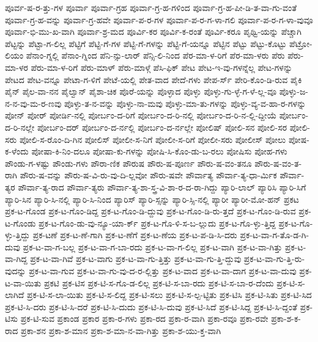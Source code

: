 {ಪೂರ್ವ-ಷ-ರ-ತ್ತು-ಗಳ
ಪೂರ್ವಾ
ಪೂರ್ವಾ-ಗ್ರಹ
ಪೂರ್ವಾ-ಗ್ರ-ಹ-ಗಳಿಂದ
ಪೂರ್ವಾ-ಗ್ರ-ಹ-ಪೀ-ಡಿ-ತ-ವಾ-ಗು-ವಂತೆ
ಪೂರ್ವಾ-ಗ್ರ-ಹ-ವನ್ನು
ಪೂರ್ವಾ-ಗ್ರ-ಹವೇ
ಪೂರ್ವಾ-ಪ-ರ-ಗಳ
ಪೂರ್ವಾ-ಪ-ರ-ಗ-ಳಾ-ಗಲಿ
ಪೂರ್ವಾ-ಪ-ರ-ಗ-ಳಾ-ವುವೂ
ಪೂರ್ವಾ-ಭಿ-ಮು-ಖ-ವಾಗಿ
ಪೂರ್ವಾ-ಶ್ರ-ಮದ
ಪೂರ್ವಿ-ಕರ
ಪೂರ್ವಿ-ಕ-ರಂತೆ
ಪೂರ್ವಿ-ಕರೂ
ಪೃಥ್ವಿ-ಯನ್ನು
ಪೆಚ್ಚಾಗಿ
ಪೆಟ್ಟನ್ನು
ಪೆಟ್ಟಾ-ಗ-ಲಿಲ್ಲ
ಪೆಟ್ಟಿಗೆ
ಪೆಟ್ಟಿ-ಗೆ-ಗಳ
ಪೆಟ್ಟಿ-ಗೆ-ಗಳನ್ನು
ಪೆಟ್ಟಿ-ಗೆ-ಯನ್ನೂ
ಪೆಟ್ಟಿನ
ಪೆಟ್ಟು
ಪೆಟ್ಟು-ಕೊಟ್ಟು
ಪೆಟ್ರೋ-ಲಿಯಂ
ಪೆನಾಂ-ಗ್ನಲ್ಲಿ
ಪೆನಾಂ-ಗ್ನಿಂದ
ಪೆನಿ-ನ್ಸು-ಲಾರ್
ಪೆನ್ಸಿ-ಲಿ-ನಿಂದ
ಪೆರ-ಮಾ-ಳ-ರಿಗೆ
ಪೆರ-ಮಾ-ಳರು
ಪೆರು
ಪೆರು-ಮಾ-ಳರ
ಪೆರು-ಮಾ-ಳ-ರಿಗೆ
ಪೆರು-ಮಾಳ್
ಪೆರು-ಮಾಳ್ಗೆ
ಪೆಸಿ-ಫಿಕ್
ಪೇಟ
ಪೇಟ-ಇ-ವು-ಗಳನ್ನೆಲ್ಲ
ಪೇಟ-ಗಳನ್ನು
ಪೇಟದ
ಪೇಟ-ವನ್ನೂ
ಪೇಟಾ-ಗ-ಳಿಗೆ
ಪೇಟೆ-ಯಲ್ಲಿ
ಪೇತ-ವಾದ
ಪೇದೆ-ಗಳು
ಪೇಪ-ರ್ಸ್
ಪೇರಿ-ಕೊಂ-ಡಿ-ರುವ
ಪೈಕಿ
ಪೈನ್
ಪೈಲ-ವಾ-ನನ
ಪೈಲ್ವಾನ್
ಪೈಶಾ-ಚಿಕ
ಪೊರೆ-ಯನ್ನು
ಪೊಳ್ಳಾದ
ಪೊಳ್ಳು
ಪೊಳ್ಳು-ಗು-ಳ್ಳೆ-ಗ-ಳೆ-ಲ್ಲ-ವೂ
ಪೊಳ್ಳು-ಜ-ನ-ನ-ವು-ಮ-ರ-ಣವು
ಪೊಳ್ಳು-ತ-ನ-ವನ್ನು
ಪೊಳ್ಳು-ನಾ-ಮವು
ಪೊಳ್ಳು-ಮಾ-ತು-ಗಳನ್ನು
ಪೊಳ್ಳು-ವ್ಯ-ವ-ಹಾ-ರ-ಗಳನ್ನು
ಪೋನ್
ಪೋರ್
ಪೋರ್ಡಿ-ನಲ್ಲಿ
ಪೋರ್ಬಂ-ದ-ರಿಗೆ
ಪೋರ್ಬಂ-ದ-ರಿ-ನಲ್ಲಿ
ಪೋರ್ಬಂ-ದ-ರಿ-ನ-ಲ್ಲಿ-ದ್ದೀಯೆ
ಪೋರ್ಬಂ-ದ-ರಿ-ನಲ್ಲೇ
ಪೋರ್ಬಂ-ದರ್
ಪೋರ್ಬಂ-ದ-ರ್ನಲ್ಲಿ
ಪೋರ್ಬಂ-ದ-ರ್ನಲ್ಲೇ
ಪೋಲಿಷ್
ಪೋಲಿ-ಸನ
ಪೋಲಿ-ಸರ
ಪೋಲಿ-ಸರು
ಪೋಲಿ-ಸ-ರೊಂ-ದಿ-ಗಿನ
ಪೋಲಿಸ್
ಪೋಲೀ-ಸ-ನಿಗೆ
ಪೋಲೀ-ಸ-ರಿಗೆ
ಪೋಲೀ-ಸರು
ಪೋಲೀಸ್
ಪೋಲು
ಪೋಷ-ಕ-ಳೆಂದು
ಪೋಷಾ-ಕಿ-ನಿಂ-ದಲೂ
ಪೋಷಾ-ಕು-ಗಳನ್ನು
ಪೋಷಿ-ಸಿ-ಕೊಂ-ಡು-ಬ-ರಲು
ಪೋಷಿಸು
ಪೋಹ-ಗಳು
ಪೌಂಡು-ಗ-ಳಷ್ಟು
ಪೌಂಡು-ಗಳು
ಪೌರಾ-ಣಿಕ
ಪೌರುಷ
ಪೌರು-ಷ-ಪೂರ್ಣ
ಪೌರು-ಷ-ವಂ-ತನೂ
ಪೌರು-ಷ-ವಂ-ತ-ರಾಗಿ
ಪೌರು-ಷ-ವನ್ನು
ಪೌರು-ಷ-ವಿ-ರು-ವು-ದಿ-ಲ್ಲವೋ
ಪೌರು-ಷವೇ
ಪೌರ್ವಾತ್ಯ
ಪೌರ್ವಾ-ತ್ಯ-ಧಾ-ರ್ಮಿಕ
ಪೌರ್ವಾ-ತ್ಯರ
ಪೌರ್ವಾ-ತ್ಯ-ರಾದ
ಪೌರ್ವಾ-ತ್ಯರು
ಪೌರ್ವಾ-ತ್ಯ-ಶಾ-ಸ್ತ್ರ-ವಿ-ಶಾ-ರ-ದ-ರಾ-ಗಿದ್ದು
ಪ್ಯಾರಿ-ಲಾಲ್
ಪ್ಯಾರಿಸಿ
ಪ್ಯಾರಿ-ಸಿಗೆ
ಪ್ಯಾರಿ-ಸಿನ
ಪ್ಯಾರಿ-ಸಿ-ನಲ್ಲಿ
ಪ್ಯಾರಿ-ಸಿ-ನಿಂದ
ಪ್ಯಾರಿಸ್
ಪ್ಯಾರಿ-ಸ್ಸನ್ನು
ಪ್ಯಾರಿ-ಸ್ಸಿ-ನಲ್ಲಿ
ಪ್ಯಾರೀ
ಪ್ಯಾರೀ-ಮೋ-ಹನ್
ಪ್ರಕಟ
ಪ್ರಕ-ಟ-ಗೊಂಡ
ಪ್ರಕ-ಟ-ಗೊಂ-ಡಿದ್ದ
ಪ್ರಕ-ಟ-ಗೊಂ-ಡಿ-ದ್ದುವು
ಪ್ರಕ-ಟ-ಗೊಂ-ಡಿ-ರು-ತ್ತದೆ
ಪ್ರಕ-ಟ-ಗೊಂ-ಡಿ-ರುವ
ಪ್ರಕ-ಟ-ಗೊಂಡು
ಪ್ರಕ-ಟ-ಗೊಂ-ಡು-ವು-ನ್ಯೂ-ಯಾ-ರ್ಕ್
ಪ್ರಕ-ಟ-ಗೊ-ಳಿ-ಸ-ಬ-ಲ್ಲುದು
ಪ್ರಕ-ಟ-ಗೊ-ಳ್ಳು-ತ್ತಿದ್ದ
ಪ್ರಕ-ಟ-ಗೊ-ಳ್ಳು-ತ್ತಿದ್ದು
ಪ್ರಕ-ಟಣೆ
ಪ್ರಕ-ಟ-ಣೆ-ಗಾಗಿ
ಪ್ರಕ-ಟ-ಣೆಗೆ
ಪ್ರಕ-ಟ-ಣೆಯ
ಪ್ರಕ-ಟ-ಪ-ಡಿ-ಸಿ-ದರು
ಪ್ರಕ-ಟ-ವಾ-ಗ-ತೊ-ಡ-ಗಿ-ದುವು
ಪ್ರಕ-ಟ-ವಾ-ಗ-ಬಲ್ಲ
ಪ್ರಕ-ಟ-ವಾ-ಗ-ಬಾ-ರದು
ಪ್ರಕ-ಟ-ವಾ-ಗ-ಲಿಲ್ಲ
ಪ್ರಕ-ಟ-ವಾಗಿ
ಪ್ರಕ-ಟ-ವಾ-ಗಿತ್ತು
ಪ್ರಕ-ಟ-ವಾ-ಗಿದ್ದ
ಪ್ರಕ-ಟ-ವಾ-ಗಿವೆ
ಪ್ರಕ-ಟ-ವಾಗು
ಪ್ರಕ-ಟ-ವಾ-ಗು-ತ್ತಿತ್ತು
ಪ್ರಕ-ಟ-ವಾ-ಗು-ತ್ತಿ-ದ್ದುವು
ಪ್ರಕ-ಟ-ವಾ-ಗು-ತ್ತಿ-ರು-ವುದನ್ನು
ಪ್ರಕ-ಟ-ವಾ-ಗುವ
ಪ್ರಕ-ಟ-ವಾ-ಗು-ವು-ದ-ರ-ಲ್ಲಿತ್ತು
ಪ್ರಕ-ಟ-ವಾದ
ಪ್ರಕ-ಟ-ವಾ-ದಾಗ
ಪ್ರಕ-ಟ-ವಾ-ದುವು
ಪ್ರಕ-ಟ-ವಾ-ಯಿತು
ಪ್ರಕಟಿ
ಪ್ರಕ-ಟಿಸ
ಪ್ರಕ-ಟಿ-ಸ-ಗೊ-ಡ-ಲಿಲ್ಲ
ಪ್ರಕ-ಟಿ-ಸ-ಬಾ-ರದು
ಪ್ರಕ-ಟಿ-ಸ-ಬಾ-ರ-ದೆಂದು
ಪ್ರಕ-ಟಿ-ಸ-ಲಾಗಿದೆ
ಪ್ರಕ-ಟಿ-ಸ-ಲಾ-ಯಿತು
ಪ್ರಕ-ಟಿ-ಸ-ಲಿದ್ದ
ಪ್ರಕ-ಟಿ-ಸಲು
ಪ್ರಕ-ಟಿ-ಸ-ಲ್ಪ-ಟ್ಟಿತು
ಪ್ರಕ-ಟಿಸಿ
ಪ್ರಕ-ಟಿ-ಸಿತು
ಪ್ರಕ-ಟಿ-ಸಿದ
ಪ್ರಕ-ಟಿ-ಸಿ-ದರು
ಪ್ರಕ-ಟಿ-ಸಿ-ದರೆ
ಪ್ರಕ-ಟಿ-ಸಿ-ದುದು
ಪ್ರಕ-ಟಿ-ಸಿ-ದುವು
ಪ್ರಕ-ಟಿ-ಸಿದೆ
ಪ್ರಕ-ಟಿ-ಸಿದ್ದ
ಪ್ರಕ-ಟಿ-ಸಿ-ದ್ದಂತೆ
ಪ್ರಕ-ಟಿಸು
ಪ್ರಕ-ಟಿ-ಸುವ
ಪ್ರಕಾಂಡ
ಪ್ರಕಾರ
ಪ್ರಕಾ-ರ-ಗಳು
ಪ್ರಕಾ-ರದ
ಪ್ರಕಾ-ರ-ವಾಗಿ
ಪ್ರಕಾ-ರವೂ
ಪ್ರಕಾ-ರವೇ
ಪ್ರಕಾ-ಶ-ಕ-ರಾದ
ಪ್ರಕಾ-ಶನ
ಪ್ರಕಾ-ಶ-ಮಾನ
ಪ್ರಕಾ-ಶ-ಮಾ-ನ-ವಾ-ಗಿತ್ತು
ಪ್ರಕಾ-ಶ-ಯು-ಕ್ತ-ವಾಗಿ
}
